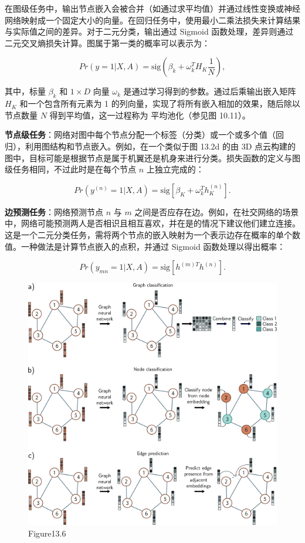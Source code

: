 在图级任务中，输出节点嵌入会被合并（如通过求平均值）并通过线性变换或神经网络映射成一个固定大小的向量。在回归任务中，使用最小二乘法损失来计算结果与实际值之间的差异。对于二元分类，输出通过 Sigmoid 函数处理，差异则通过二元交叉熵损失计算。图属于第一类的概率可以表示为：

\[
Pr(y = 1|X, A) = \text{sig}(\beta_k + \omega_k^T H_K \frac{1}{N}), \tag{13.2}
\]

其中，标量 \(\beta_k\) 和 \(1 \times D\) 向量 \(\omega_k\) 是通过学习得到的参数。通过后乘输出嵌入矩阵 \(H_K\) 和一个包含所有元素为 1 的列向量，实现了将所有嵌入相加的效果，随后除以节点数量 \(N\) 得到平均值，这一过程称为 平均池化（参见图 10.11）。

\textbf{节点级任务}：网络对图中每个节点分配一个标签（分类）或一个或多个值（回归），利用图结构和节点嵌入。例如，在一个类似于图 13.2d 的由 3D 点云构建的图中，目标可能是根据节点是属于机翼还是机身来进行分类。损失函数的定义与图级任务相同，不过此时是在每个节点 \(n\) 上独立完成的：

\[
Pr(y^{(n)} = 1|X, A) = \text{sig}\left[\beta_K + \omega_k^T h_K^{(n)} \right]. \tag{13.3}
\]

\textbf{边预测任务}：网络预测节点 \(n\) 与 \(m\) 之间是否应存在边。例如，在社交网络的场景中，网络可能预测两人是否相识且相互喜欢，并在是的情况下建议他们建立连接。这是一个二元分类任务，需将两个节点的嵌入映射为一个表示边存在概率的单个数值。一种做法是计算节点嵌入的点积，并通过 Sigmoid 函数处理以得出概率：

\[
Pr(y_{mn} = 1|X, A) = \text{sig}\left[h^{(m)T}h^{(n)} \right]. \tag{13.4}
\]
\begin{figure}[ht!]
\centering
\includegraphics[width=0.7\linewidth]{png/chapter13/GraphProblems.png}
\caption{Figure13.6}
\end{figure}

